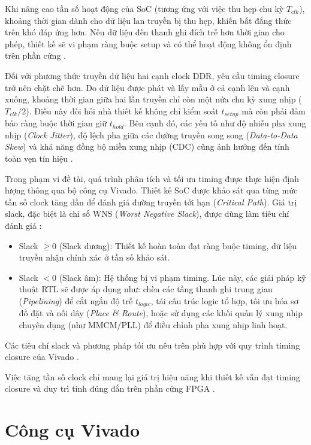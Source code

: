 Khi nâng cao tần số hoạt động của SoC (tương ứng với việc thu hẹp chu kỳ $T_{clk}$), khoảng thời gian dành cho dữ liệu lan truyền bị thu hẹp, khiến bất đẳng thức trên khó đáp ứng hơn. Nếu dữ liệu đến thanh ghi đích trễ hơn thời gian cho phép, thiết kế sẽ vi phạm ràng buộc setup và có thể hoạt động không ổn định trên phần cứng \cite{amd_ug949}.

Đối với phương thức truyền dữ liệu hai cạnh clock DDR, yêu cầu timing closure trở nên chặt chẽ hơn. Do dữ liệu được phát và lấy mẫu ở cả cạnh lên và cạnh xuống, khoảng thời gian giữa hai lần truyền chỉ còn một nửa chu kỳ xung nhịp ($T_{clk}/2$). Điều này đòi hỏi nhà thiết kế không chỉ kiểm soát $t_{setup}$ mà còn phải đảm bảo ràng buộc thời gian giữ $t_{hold}$. Bên cạnh đó, các yếu tố như độ nhiễu pha xung nhịp (\textit{Clock Jitter}), độ lệch pha giữa các đường truyền song song (\textit{Data-to-Data Skew}) và khả năng đồng bộ miền xung nhịp (CDC) cũng ảnh hưởng đến tính toàn vẹn tín hiệu \cite{amd_ug949,psarras2017nocddr}.

Trong phạm vi đề tài, quá trình phân tích và tối ưu timing được thực hiện định lượng thông qua bộ công cụ Vivado. Thiết kế SoC được khảo sát qua từng mức tần số clock tăng dần để đánh giá đường truyền tới hạn (\textit{Critical Path}). Giá trị slack, đặc biệt là chỉ số WNS (\textit{Worst Negative Slack}), được dùng làm tiêu chí đánh giá \cite{amd_vivado_docs,amd_ug949}:

\begin{itemize}
    \item {Slack $\geq 0$ (Slack dương):} Thiết kế hoàn toàn đạt ràng buộc timing, dữ liệu truyền nhận chính xác ở tần số khảo sát.
    \item {Slack $< 0$ (Slack âm):} Hệ thống bị vi phạm timing. Lúc này, các giải pháp kỹ thuật RTL sẽ được áp dụng như: chèn các tầng thanh ghi trung gian (\textit{Pipelining}) để cắt ngắn độ trễ $t_{logic}$, tái cấu trúc logic tổ hợp, tối ưu hóa sơ đồ đặt và nối dây (\textit{Place \& Route}), hoặc sử dụng các khối quản lý xung nhịp chuyên dụng (như MMCM/PLL) để điều chỉnh pha xung nhịp linh hoạt.
\end{itemize}
Các tiêu chí slack và phương pháp tối ưu nêu trên phù hợp với quy trình timing closure của Vivado \cite{amd_ug949}.

Việc tăng tần số clock chỉ mang lại giá trị hiệu năng khi thiết kế vẫn đạt timing closure và duy trì tính đúng đắn trên phần cứng FPGA \cite{amd_ug949}.

\section{Công cụ Vivado}

